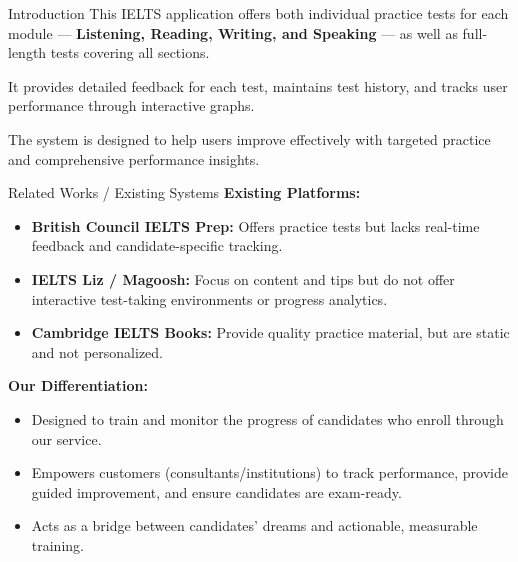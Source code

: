 \documentclass{beamer}
\begin{document}
\begin{frame}{Introduction}
  This IELTS application offers both individual practice tests for each module — \textbf{Listening, Reading, Writing, and Speaking} — as well as full-length tests covering all sections.

  \vspace{0.2cm}
  It provides detailed feedback for each test, maintains test history, and tracks user performance through interactive graphs.

  \vspace{0.2cm}
  The system is designed to help users improve effectively with targeted practice and comprehensive performance insights.
\end{frame}

\begin{frame}{Related Works / Existing Systems}
  \textbf{Existing Platforms:}
  \begin{itemize}
    \item \textbf{British Council IELTS Prep:} Offers practice tests but lacks real-time feedback and candidate-specific tracking.
    \item \textbf{IELTS Liz / Magoosh:} Focus on content and tips but do not offer interactive test-taking environments or progress analytics.
    \item \textbf{Cambridge IELTS Books:} Provide quality practice material, but are static and not personalized.
  \end{itemize}
  
  \vspace{0.3cm}
  \textbf{Our Differentiation:}
  \begin{itemize}
    \item Designed to train and monitor the progress of candidates who enroll through our service.
    \item Empowers customers (consultants/institutions) to track performance, provide guided improvement, and ensure candidates are exam-ready.
    \item Acts as a bridge between candidates' dreams and actionable, measurable training.
  \end{itemize}
\end{frame}
\end{document}
